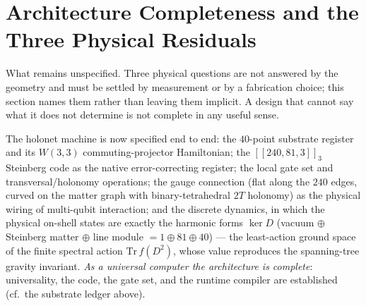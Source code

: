 \documentclass[11pt]{article}
\begin{document}
\section{Architecture Completeness and the Three Physical Residuals}

\begin{plainbox}
What remains unspecified. Three physical questions are not answered by the geometry
and must be settled by measurement or by a fabrication choice; this section names them
rather than leaving them implicit. A design that cannot say what it does not determine is
not complete in any useful sense.
\end{plainbox}

\label{sec:architecture-completeness}

The holonet machine is now specified end to end: the $40$-point substrate
register and its $W(3,3)$ commuting-projector Hamiltonian; the $[[240,81,3]]_3$
Steinberg code as the native error-correcting register; the local gate set
and transversal/holonomy operations; the gauge connection (flat along the
$240$ edges, curved on the matter graph with binary-tetrahedral $2T$
holonomy) as the physical wiring of multi-qubit interaction; and the discrete
dynamics, in which the physical on-shell states are exactly the harmonic
forms $\ker D$ (vacuum $\oplus$ Steinberg matter $\oplus$ line module
$=1\oplus81\oplus40$) --- the least-action ground space of the finite
spectral action $\mathrm{Tr}\,f(D^2)$, whose value reproduces the
spanning-tree gravity invariant. \emph{As a universal computer the
architecture is complete}: universality, the code, the gate set, and the
runtime compiler are established (cf.\ the substrate ledger above).
\end{document}
